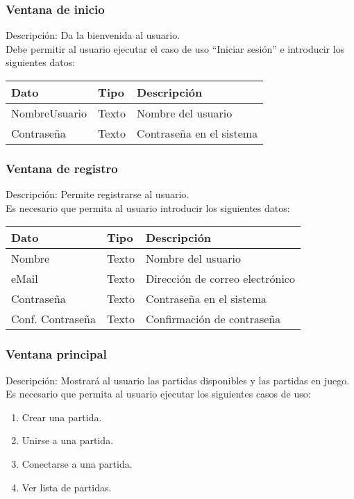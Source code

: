 \subsubsection{Ventana de inicio}
{\footnotesize

Descripción: Da la bienvenida al usuario.\\ Debe permitir al usuario ejecutar el
caso de uso ``Iniciar sesión'' e introducir los siguientes datos: \\

\begin{tabularx}{0.9\textwidth}{llX}
\hline
\textbf{Dato} & \textbf{Tipo} & \textbf{Descripción} \\
\hline
NombreUsuario & Texto & Nombre del usuario \\
Contraseña & Texto & Contraseña en el sistema \\
\hline
\end{tabularx}

\subsubsection{Ventana de registro}
{\footnotesize



Descripción: Permite registrarse al usuario.\\
Es necesario que
permita al usuario introducir los siguientes datos: \\

\begin{tabularx}{0.9\textwidth}{llX}
\hline
\textbf{Dato} & \textbf{Tipo} & \textbf{Descripción} \\
\hline
Nombre & Texto & Nombre del usuario \\
eMail & Texto & Dirección de correo electrónico \\
Contraseña & Texto & Contraseña en el sistema \\
Conf. Contraseña & Texto & Confirmación de contraseña \\
\hline
\end{tabularx}

}

\subsubsection{Ventana principal}
{\footnotesize

Descripción: Mostrará al usuario las partidas disponibles y las partidas en
juego.\\
Es necesario que
permita al usuario ejecutar los siguientes casos de uso: \\
\begin{enumerate}
\item Crear una partida.
\item Unirse a una partida.
\item Conectarse a una partida.
\item Ver lista de partidas.


\end{enumerate}}}
